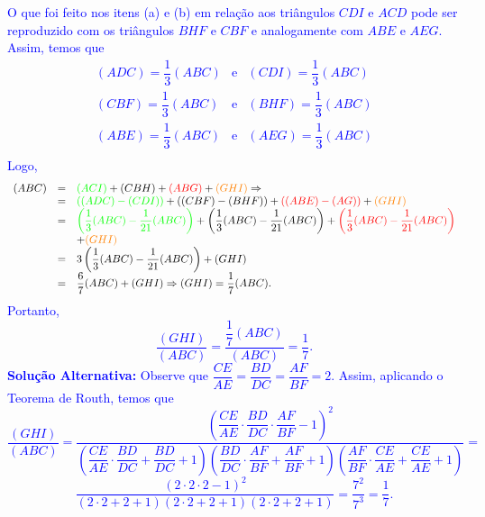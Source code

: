 \documentclass[oneside,a4paper,12pt]{article}
\theoremstyle{Colorido}
\theoremstyle{solu}
\theoremstyle{dotlessP}
\begin{document}
\textcolor{blue}{O que foi feito nos itens (a) e (b) em relação aos triângulos $CDI$ e $ACD$ pode ser reproduzido com os triângulos $BHF$ e $CBF$ e analogamente com $ABE$ e $AEG.$ Assim, temos que\[\begin{array}{ccc}(ADC) = \dfrac{1}{3}(ABC) & \mbox{e} & (CDI) = \dfrac{1}{3}(ABC)\\(CBF) = \dfrac{1}{3}(ABC) & \mbox{e} & (BHF) = \dfrac{1}{3}(ABC) \\(ABE) = \dfrac{1}{3}(ABC) & \mbox{e} & (AEG) = \dfrac{1}{3}(ABC)\\\end{array}\]Logo,\[\begin{array}{rcl}(ABC) &=& \textcolor{green}{(ACI)} + (CBH) + \textcolor{red}{(ABG)} + \textcolor{orange}{(GHI)} \Rightarrow \\
&=& \textcolor{green}{\left((ADC) - (CDI)\right)} + \left( (CBF) - (BHF)\right) + \textcolor{red}{\left( (ABE) - (AG) \right)} + \textcolor{orange}{(GHI)} \\ &=& \textcolor{green}{\left(\dfrac{1}{3}(ABC) - \dfrac{1}{21}(ABC)\right)} + \left(\dfrac{1}{3}(ABC) - \dfrac{1}{21}(ABC)\right) +\textcolor{red}{\left(\dfrac{1}{3}(ABC) - \dfrac{1}{21}(ABC)\right)}   \\
&\phantom{=}& + \textcolor{orange}{(GHI)} \\
&=& 3 \left( \dfrac{1}{3}(ABC) - \dfrac{1}{21}(ABC)\right) + (GHI) \\&=& \dfrac{6}{7}(ABC) + (GHI) \Rightarrow (GHI) = \dfrac{1}{7}(ABC).\end{array}\]
Portanto,\[\dfrac{(GHI)}{(ABC)} = \dfrac{\dfrac{1}{7}(ABC)}{(ABC)} = \dfrac{1}{7}.\] \newline \newline \textbf{Solução Alternativa:} Observe que $\dfrac{CE}{AE} = \dfrac{BD}{DC} = \dfrac{AF}{BF} = 2.$ Assim, aplicando o Teorema de Routh, temos que \[\dfrac{(GHI)}{(ABC)} = \dfrac{\left(\dfrac{CE}{AE} \cdot \dfrac{BD}{DC} \cdot \dfrac{AF}{BF} - 1\right)^2}{\left(\dfrac{CE}{AE}  \cdot \dfrac{BD}{DC} + \dfrac{BD}{DC} + 1\right)\left( \dfrac{BD}{DC} \cdot \dfrac{AF}{BF} + \dfrac{AF}{BF} + 1\right)\left(\dfrac{AF}{BF} \cdot \dfrac{CE}{AE}  + \dfrac{CE}{AE}  + 1\right)} = \]\[\dfrac{(2 \cdot 2 \cdot 2 - 1)^2}{(2 \cdot 2+ 2 + 1)(2 \cdot 2+ 2 + 1)(2 \cdot 2+ 2 + 1)} = \dfrac{7^2}{7^3} = \dfrac{1}{7}.\]}
\end{document}

